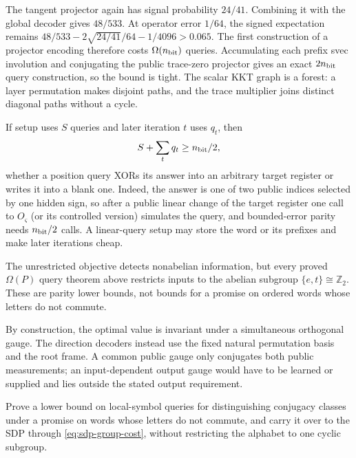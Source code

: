 The tangent projector again has signal probability $24/41$.  Combining it
with the global decoder gives $48/533$.  At operator error $1/64$, the signed
expectation remains
$48/533-2\sqrt{24/41}/64-1/4096>0.065$.  The first construction of a
projector encoding therefore costs $\Omega(n_{\rm bit})$ queries.  Accumulating each prefix svec involution and
conjugating the public trace-zero projector gives an exact $2n_{\rm bit}$
query construction, so the bound is tight.  The scalar KKT graph is a forest:
a layer permutation makes disjoint paths, and the trace multiplier joins
distinct diagonal paths without a cycle.

If setup uses $S$ queries and later iteration $t$ uses $q_t$, then
\begin{equation}
 S+\sum_tq_t\geq n_{\rm bit}/2,                            \label{eq:sdp-group-ledger}
\end{equation}
whether a position query XORs its answer into an arbitrary target register or
writes it into a blank one.  Indeed, the answer is one of two public indices
selected by one hidden sign, so after a public linear change of the target
register one call to $O_\varsigma$ (or its controlled version) simulates the
query, and bounded-error parity needs $n_{\rm bit}/2$ calls.  A linear-query setup
may store the word or its prefixes and make later iterations cheap.

The unrestricted objective detects nonabelian information, but every proved
$\Omega(P)$ query theorem above restricts inputs to the abelian subgroup
$\{e,t\}\cong\mathbb Z_2$.  These are parity lower bounds, not bounds for a
promise on ordered words whose letters do not commute.

By construction, the optimal value is invariant under a simultaneous
orthogonal gauge.  The direction decoders instead use the fixed natural
permutation basis and the root frame.  A common public gauge only conjugates
both public measurements; an input-dependent output gauge would have to be
learned or supplied and lies outside the stated output requirement.

\begin{openproblem}
\label{open:sdp-nonabelian}
Prove a lower bound on local-symbol queries for distinguishing conjugacy
classes under a promise on words whose letters do not commute, and carry it
over to the SDP through \eqref{eq:sdp-group-cost}, without restricting the
alphabet to one cyclic subgroup.
\end{openproblem}

